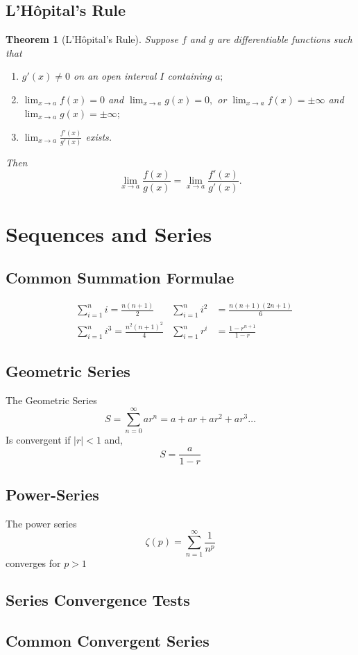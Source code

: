 \documentclass[12pt]{article}
\newtheorem{thrm}{Theorem}
\begin{document}
\subsection{L'H\^{o}pital's Rule}
\begin{thrm}[L'H\^{o}pital's Rule]
	Suppose $f$ and $g$ are differentiable functions such that
\begin{enumerate}
	\item $g'(x) \neq 0$ on an open interval  $I$ containing $a;$
	\item $\lim_{x\to a} f(x) = 0$ and $\lim_{x\to a} g(x) = 0,$ or $\lim_{x\to a} f(x) = \pm \infty$ and $\lim_{x\to a} g(x) = \pm \infty;$
	\item $\lim_{x\to a} \frac{f'(x)}{g'(x)}$ exists.
\end{enumerate}
	Then
	$$\lim_{x\to a} \frac{f(x)}{g(x)} = \lim_{x\to a} \frac{f'(x)}{g'(x)}.$$
\end{thrm}


\section{Sequences and Series}
\subsection{Common Summation Formulae}
\begin{align*}
&\sum_{i = 1}^{n} i = \frac{n(n+1)}{2} & \sum_{i = 1}^{n} i^2 &= \frac{n(n+1)(2n+1)}{6} \\
&\sum_{i = 1}^{n}i^3 = \frac{n^2(n+1)^2}{4} & \sum_{i = 1}^{n}r^i &= \frac{1-r^{n+1}}{1-r}
\end{align*}
\subsection{Geometric Series}
The Geometric Series
$$S = \sum_{n=0}^{\infty}{ar^{n}} = a + ar + ar^2 + ar^3\dots 
$$
Is convergent if $|r|< 1$ and,
$$S = \frac{a}{1-r}$$
\subsection{Power-Series}
The power series
$$\zeta(p) = \sum_{n = 1}^{\infty} \frac{1}{n^p}$$
converges for $p>1$
\subsection{Series Convergence Tests}
\subsection{Common Convergent Series}
\end{document}
